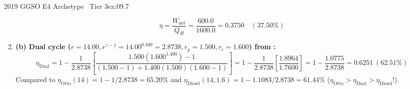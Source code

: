 \begin{workedexample}{2019 GGSO E4 Archetype \textbar\ Tier 3}{ex:09.7}
\begin{enumerate}
  \[
    \eta = \frac{W_{\mathrm{net}}}{Q_H} = \frac{600.0}{1600.0} = \mathbf{0.3750} \quad (37.50\%)
  \]
  \item \textbf{(b) Dual cycle ($r=14.00, r^{\gamma-1} = 14.00^{0.400} = 2.8738, r_p = 1.500, r_c = 1.600$) from :}
  \[
    \eta_{\mathrm{Dual}} = 1 - \frac{1}{2.8738}\left[\frac{1.500(1.600^{1.400}) - 1}{(1.500 - 1) + 1.400(1.500)(1.600 - 1)}\right] = 1 - \frac{1}{2.8738}\left[\frac{1.8964}{1.7600}\right] = 1 - \frac{1.0775}{2.8738} = \mathbf{0.6251} \ (62.51\%)
  \]
  Compared to $\eta_{\mathrm{Otto}}(14) = 1 - 1/2.8738 = \mathbf{65.20\%}$ and $\eta_{\mathrm{Diesel}}(14, 1.6) = 1 - 1.1083/2.8738 = \mathbf{61.44\%}$ ($\eta_{\mathrm{Otto}} > \eta_{\mathrm{Dual}} > \eta_{\mathrm{Diesel}}$!).
\end{enumerate}
\end{workedexample}

